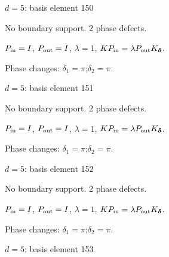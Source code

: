 \vfill
{\footnotesize\texttt{}}
\newpage
{}
{\Large $d=5$: basis element 150}\par
No boundary support. 2 phase defects.
\begin{center}
\end{center}
\vspace{-1mm}
$P_{\rm in}=I$, \quad $P_{\rm out}=I$, \quad $\lambda=1$, \qquad $K P_{\rm in}=\lambda P_{\rm out}K_{\boldsymbol\delta}$.
\par\smallskip\begin{minipage}{.98\linewidth}\small Phase changes: $\delta_{1}=\pi$;\quad $\delta_{2}=\pi$.\end{minipage}
\vfill
{\footnotesize\texttt{}}
\newpage
{}
{\Large $d=5$: basis element 151}\par
No boundary support. 2 phase defects.
\begin{center}
\end{center}
\vspace{-1mm}
$P_{\rm in}=I$, \quad $P_{\rm out}=I$, \quad $\lambda=1$, \qquad $K P_{\rm in}=\lambda P_{\rm out}K_{\boldsymbol\delta}$.
\par\smallskip\begin{minipage}{.98\linewidth}\small Phase changes: $\delta_{1}=\pi$;\quad $\delta_{2}=\pi$.\end{minipage}
\vfill
{\footnotesize\texttt{}}
\newpage
{}
{\Large $d=5$: basis element 152}\par
No boundary support. 2 phase defects.
\begin{center}
\end{center}
\vspace{-1mm}
$P_{\rm in}=I$, \quad $P_{\rm out}=I$, \quad $\lambda=1$, \qquad $K P_{\rm in}=\lambda P_{\rm out}K_{\boldsymbol\delta}$.
\par\smallskip\begin{minipage}{.98\linewidth}\small Phase changes: $\delta_{1}=\pi$;\quad $\delta_{2}=\pi$.\end{minipage}
\vfill
{\footnotesize\texttt{}}
\newpage
{}
{\Large $d=5$: basis element 153}\par
